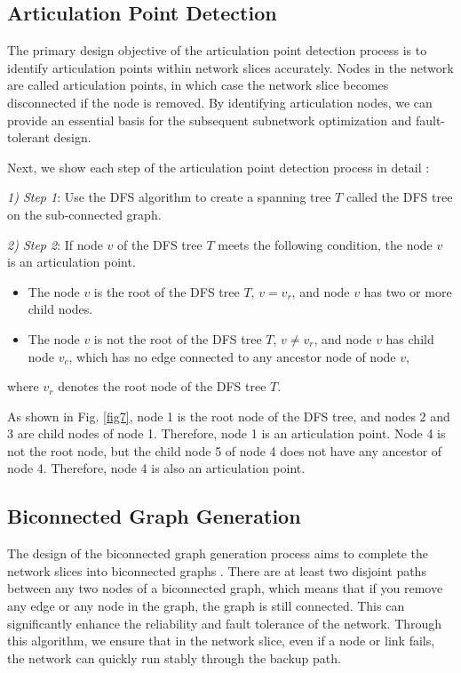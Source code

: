 \documentclass[journal]{IEEEtran}
\begin{document}
\subsection{Articulation Point Detection}
The primary design objective of the articulation point detection process is to identify articulation points within network slices accurately. Nodes in the network are called articulation points, in which case the network slice becomes disconnected if the node is removed.
By identifying articulation nodes, we can provide an essential basis for the subsequent subnetwork optimization and fault-tolerant design.

Next, we show each step of the articulation point detection process in detail \cite{44}:

\emph{1) Step 1}:
Use the DFS algorithm to create a spanning tree $T$ called the DFS tree on the sub-connected graph.

\emph{2) Step 2}: If node $v$ of the DFS tree $T$ meets the following condition, the node $v$ is an articulation point.
\begin{itemize}  
  \item The node $v$ is the root of the DFS tree $T$, $v= {{v}_{r}}$, and node $v$ has two or more child nodes.
  \item The node $v$ is not the root of the DFS tree $T$, $v\ne {{v}_{r}}$, and node $v$ has child node $v_c$, which has no edge connected to any ancestor node of node $v$,
\end{itemize}
where $v_r$ denotes the root node of the DFS tree $T$.



As shown in Fig. \ref{fig7}, node 1 is the root node of the DFS tree, and nodes 2 and 3 are child nodes of node 1. Therefore, node 1 is an articulation point. Node 4 is not the root node, but the child node 5 of node 4 does not have any ancestor of node 4. Therefore, node 4 is also an articulation point.

\subsection{Biconnected Graph Generation}

The design of the biconnected graph generation process aims to complete the network slices into biconnected graphs \cite{28}. 
There are at least two disjoint paths between any two nodes of a biconnected graph, which means that if you remove any edge or any node in the graph, the graph is still connected. This can significantly enhance the reliability and fault tolerance of the network. Through this algorithm, we ensure that in the network slice, even if a node or link fails, the network can quickly run stably through the backup path.
\end{document}
